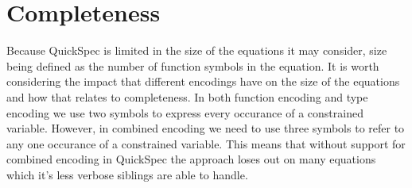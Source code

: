 \section{Completeness}

Because QuickSpec is limited in the size
of the equations it may consider, size being
defined as the number of function symbols in the
equation. It is worth considering the impact that
different encodings have on the size of the equations 
and how that relates to completeness. In both
function encoding and type encoding we use two
symbols to express every occurance of
a constrained variable. However, in
combined encoding we need to use three symbols
to refer to any one occurance of a constrained variable.
This means that without support for combined encoding in
QuickSpec the approach loses out on many equations which
it's less verbose siblings are able to handle.

